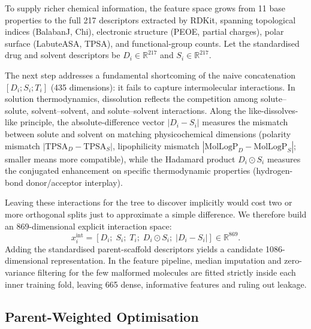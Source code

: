 To supply richer chemical information, the feature space grows from 11 base properties to the full 217 descriptors extracted by RDKit, spanning topological indices (BalabanJ, Chi), electronic structure (PEOE, partial charges), polar surface (LabuteASA, TPSA), and functional-group counts. Let the standardised drug and solvent descriptors be $D_i \in \mathbb{R}^{217}$ and $S_i \in \mathbb{R}^{217}$.

The next step addresses a fundamental shortcoming of the naive concatenation $[D_i; S_i; T_i]$ (435 dimensions): it fails to capture intermolecular interactions. In solution thermodynamics, dissolution reflects the competition among solute--solute, solvent--solvent, and solute--solvent interactions. Along the like-dissolves-like principle, the absolute-difference vector $|D_i - S_i|$ measures the mismatch between solute and solvent on matching physicochemical dimensions (polarity mismatch $|\mathrm{TPSA}_D - \mathrm{TPSA}_S|$, lipophilicity mismatch $|\mathrm{MolLogP}_D - \mathrm{MolLogP}_S|$; smaller means more compatible), while the Hadamard product $D_i \odot S_i$ measures the conjugated enhancement on specific thermodynamic properties (hydrogen-bond donor/acceptor interplay).

Leaving these interactions for the tree to discover implicitly would cost two or more orthogonal splits just to approximate a simple difference. We therefore build an 869-dimensional explicit interaction space:
\begin{equation}
x_i^{\mathrm{int}} = \left[ D_i;\; S_i;\; T_i;\; D_i \odot S_i;\; |D_i - S_i| \right] \in \mathbb{R}^{869}.
\end{equation}
Adding the standardised parent-scaffold descriptors yields a candidate 1086-dimensional representation. In the feature pipeline, median imputation and zero-variance filtering for the few malformed molecules are fitted strictly inside each inner training fold, leaving 665 dense, informative features and ruling out leakage.

\subsection{Parent-Weighted Optimisation}

